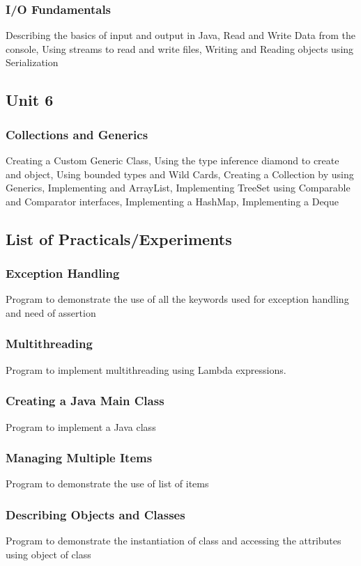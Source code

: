 \documentclass{article}
\begin{document}
\begin{multicols*}{2}
    \subsubsection*{I/O Fundamentals}
    Describing the basics of input and output in Java, Read and Write Data from the console, Using streams to read and write files, Writing and Reading objects using Serialization
    \subsection*{Unit 6}
    \subsubsection*{Collections and Generics}
    Creating a Custom Generic Class, Using the type inference diamond to create and object, Using bounded types and Wild Cards, Creating a Collection by using Generics, Implementing and ArrayList, Implementing TreeSet using Comparable and Comparator interfaces, Implementing a HashMap, Implementing a Deque
    \subsection*{List of Practicals/Experiments}
    \subsubsection*{Exception Handling}
    Program to demonstrate the use of all the keywords used for exception handling and need of assertion
    \subsubsection*{Multithreading}
    Program to implement multithreading using Lambda expressions.
    \subsubsection*{Creating a Java Main Class}
    Program to implement a Java class
    \subsubsection*{Managing Multiple Items}
    Program to demonstrate the use of list of items
    \subsubsection*{Describing Objects and Classes}
    Program to demonstrate the instantiation of class and accessing the attributes using object of class

\end{multicols*}
\end{document}
